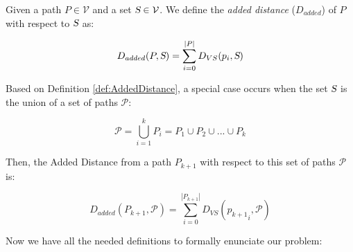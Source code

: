 \documentclass[graybox]{svmult}
\newcommand{\PathSet}{\ensuremath{\mathcal P} }
\newcommand{\Path}{\ensuremath{P} }
\newcommand{\VertexSet}{\ensuremath{\mathcal V} }
\newcommand{\Set}{\ensuremath{\textsl S} }
\newcommand{\VertexSetDistance}{\ensuremath{D_{VS}} }
\newcommand{\AddedDistance}{\ensuremath{D_{added}} }
\begin{document}
\begin{definition}
\label{def:AddedDistance}
Given a path $\Path \in \VertexSet$ and a set $\Set \in \VertexSet$. We define the \emph{added distance} ($\AddedDistance$) of $\Path$ with respect to $\Set$ as:

\[ \AddedDistance (\Path, \Set) = \sum _{i = 0}^{|\Path|} \VertexSetDistance(p_{i}, \Set) \]

\end{definition}

Based on Definition \ref{def:AddedDistance}, a special case occurs when the set $\Set$ is the union of a set of paths $\PathSet$:

\[ \PathSet = \bigcup_{i = 1}^{k} \Path_{i} = \Path_{1} \cup \Path_{2} \cup ... \cup \Path_{k} \] 

Then, the Added Distance from a path $P_{k+1}$ with respect to this set of paths $\PathSet$ is:

\begin{equation} 
\AddedDistance (\Path_{k+1}, \PathSet) =  \sum _{i = 0}^{|\Path_{k+1}|} \VertexSetDistance({p_{k+1}}_{i}, \PathSet) 
\label{eq:PathDistance}
\end{equation}

Now we have all the needed definitions to formally enunciate our problem:
\end{document}
